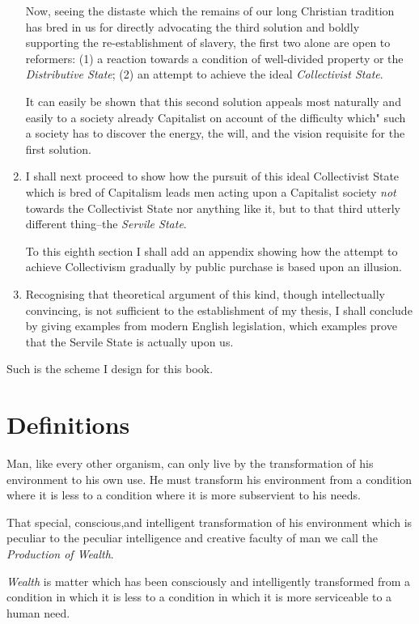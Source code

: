 \documentclass{book}
\begin{document}
\begin{enumerate}
\begin{enumerate}
\end{enumerate}
Now, seeing the distaste which the remains of our long Christian tradition has bred in us for directly advocating the third solution and boldly supporting the re-establishment of slavery, the first two alone are open to reformers: (1) a reaction towards a condition of well-divided property or the \emph{Distributive State}; (2) an attempt to achieve the ideal \emph{Collectivist State}.

It can easily be shown that this second solution appeals most naturally and easily to a society already Capitalist on account of the difficulty which" such a society has to discover the energy, the will, and the vision requisite for the first solution.


\item I shall next proceed to show how the pursuit of this ideal Collectivist State which is bred of Capitalism leads men acting upon a Capitalist society \emph{not} towards the Collectivist State nor anything like it, but to that third utterly different thing–the \emph{Servile State}.

To this eighth section I shall add an appendix showing how the attempt to achieve Collectivism gradually by public purchase is based upon an illusion.


\item Recognising that theoretical argument of this kind, though intellectually convincing, is not sufficient to the establishment of my thesis, I shall conclude by giving examples from modern English legislation, which examples prove that the Servile State is actually upon us.



\end{enumerate}
Such is the scheme I design for this book.

\chapter{Definitions}
\label{chapter-1}
Man, like every other organism, can only live by the transformation of his environment to his own use. He must transform his environment from a condition where it is less to a condition where it is more subservient to his needs.

That special, conscious,and intelligent transformation of his environment which is peculiar to the peculiar intelligence and creative faculty of man we call the \emph{Production of Wealth}.

\emph{Wealth} is matter which has been consciously and intelligently transformed from a condition in which it is less to a condition in which it is more serviceable to a human need.
\end{document}
